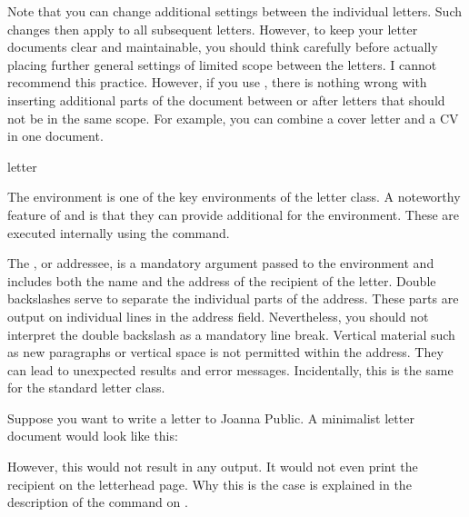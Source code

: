 Note that you can change additional settings between the individual letters.
Such changes then apply to all subsequent letters. However, to keep your
letter documents clear and maintainable, you should think carefully before
actually placing further general settings of limited scope between the
letters. I cannot recommend this practice. However, if you use
, there is nothing wrong with inserting additional parts
of the document between or after letters that should not be in the same scope.
For example, you can combine a cover letter and a CV in one document.

\begin{Declaration}
  \begin{Environment}{letter}
  \end{Environment}
\end{Declaration}
%
The  environment is one of the key environments of the
letter class. A noteworthy
feature of  and  is that they can provide
additional  for the  environment. These
 are executed internally using the
 command.

The , or addressee, is a mandatory argument passed to the
 environment and includes both the name and the address of
the recipient of the letter. Double backslashes serve to
separate the individual parts of the address. These parts are output on
individual lines in the address field. Nevertheless, you should not interpret
the double backslash as a mandatory line break. Vertical material such as new
paragraphs or vertical space is not permitted within the address. They can
lead to unexpected results and error messages. Incidentally, this is the same
for the standard letter class.

\begin{Example}
  \label{desc:\LabelBase.env.letter.example}%
  Suppose you want to write a letter to Joanna Public. A minimalist
  letter document would look like this:
  However, this would not result in any output. It would not even print the
  recipient on the letterhead page. Why this is the case is explained in the
  description of the  command on
  .
\end{Example}
%
\EndIndexGroup


